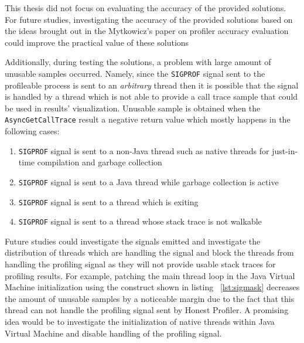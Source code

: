 \documentclass[..thesis.tex]{subfiles}
\begin{document}
This thesis did not focus on evaluating the accuracy of the provided solutions. For future studies, investigating the accuracy of the provided solutions based on the ideas brought out in the Mytkowicz's paper on profiler accuracy evaluation \cite{mytkowicz_evaluating_2010} could improve the practical value of these solutions

Additionally, during testing the solutions, a problem with large amount of unusable samples occurred. 
Namely, since the \texttt{SIGPROF} signal sent to the profileable process is sent to an \textit{arbitrary} thread then it is possible that the signal is handled by a thread which is not able to provide a call trace sample that could be used in results' visualization. Unusable sample is obtained when the \texttt{Async\-Get\-Call\-Trace} result a negative return value which mostly happens in the following cases:
\begin{enumerate}
	\item \texttt{SIGPROF} signal is sent to a non-Java thread such as native threads for just-in-time compilation and garbage collection
	\item \texttt{SIGPROF} signal is sent to a Java thread while garbage collection is active
	\item \texttt{SIGPROF} signal is sent to a thread which is exiting
	\item \texttt{SIGPROF} signal is sent to a thread whose stack trace is not walkable
\end{enumerate}

Future studies could investigate the signals emitted and investigate the distribution of threads which are handling the signal and block the threads from handling the profiling signal as they will not provide usable stack traces for profiling results.
For example, patching the main thread loop in the Java Virtual Machine initialization using the construct shown in listing ~\ref{lst:sigmask} decreases the amount of unusable samples by a noticeable margin due to the fact that this thread can not handle the profiling signal sent by Honest Profiler. A promising idea would be to investigate the initialization of native threads within Java Virtual Machine and disable handling of the profiling signal. 
\end{document}
